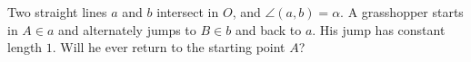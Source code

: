 Two straight lines $a$ and $b$ intersect in $O$, and $\angle(a, b) = \alpha$. A grasshopper starts in $A \in a$ and alternately jumps to $B \in b$ and back to $a$. His jump has constant length $1$. Will he ever return to the starting point $A$?
